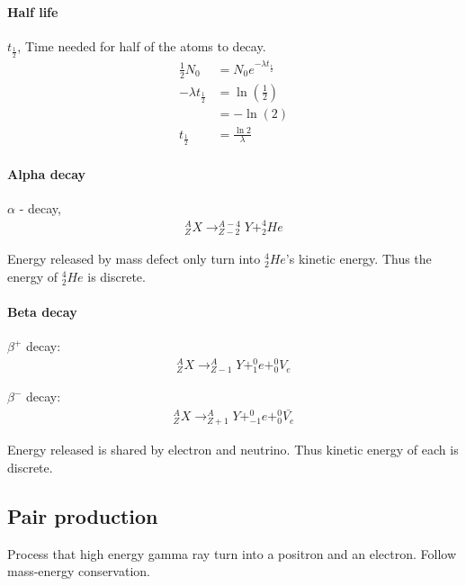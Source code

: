         \paragraph{Half life}
            $t_{\frac{1}{2}}$, Time needed for half of the atoms to decay.
            \begin{align}
                \frac{1}{2} N_0 &= N_0 e^{- \lambda t_{\frac{1}{2}}} \\
                - \lambda t_{\frac{1}{2}} &= \ln(\frac{1}{2}) \\ 
                                          &= - \ln(2) \\
                t_{\frac{1}{2}} &= \frac{\ln 2}{\lambda}
            \end{align}

        \paragraph{Alpha decay}
            $\alpha$ - decay, 
            \begin{align}
                _Z^A X \to _{Z-2}^{A-4} Y + _2^4 He
            \end{align}

            Energy released by mass defect only turn into $_2^4 He$'s kinetic energy. Thus the energy of $_2^4 He$ is discrete.

        \paragraph{Beta decay}
            $\beta^+$ decay:
            \begin{align}
                _Z^A X \to _{Z-1}^{A} Y + _{1}^0 e + _0^0 V_e
            \end{align}

            $\beta^-$ decay:
            \begin{align}
                _Z^A X \to _{Z+1}^{A} Y + _{-1}^0 e + _0^0 \bar{V_e}
            \end{align}

            Energy released is shared by electron and neutrino. Thus kinetic energy of each is discrete.
        
    \subsection{Pair production}
        Process that high energy gamma ray turn into a positron and an electron. Follow mass-energy conservation.


